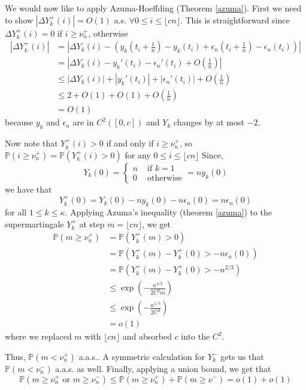 We would now like to apply Azuma-Hoeffding (Theorem \ref{azuma}). First we need to show \(|\Delta Y_{k}^{+}(i)| = O(1)\) a.s. \(\forall 0 \leq i \leq \lfloor {cn} \rfloor\). This is straightforward since \(\Delta Y_{k}^{+}(i) = 0\) if \(i \geq \nu_{n}^{+}\), otherwise 
\begin{align*}
    |\Delta Y_{k}^{+}(i)| &= |\Delta Y_{k}(i) - (y_{k}(t_{i} + \frac{1}{n}) - y_{k}(t_{i}) + \epsilon_{n}(t_{i} + \frac{1}{n}) - \epsilon_{n}(t_{i}))| \\
    &= |\Delta Y_{k}(i) - y_{k}'(t_{i}) - \epsilon_{n}'(t_{i}) + O(\frac{1}{n})| \\
    &\leq |\Delta Y_{k}(i)| + |y_{k}'(t_{i})| + |\epsilon_{n}'(t_{i})| + O(\frac{1}{n}) \\
    &\leq 2 + O(1) + O(1) + O(\frac{1}{n}) \\
    &= O(1)
\end{align*}
because \(y_{k}\) and \(\epsilon_{n}\) are in \(C^{2}([0, c])\) and \(Y_{k}\) changes by at most \(-2\).

Now note that \(Y_{k}^{+}(i) > 0\) if and only if \(i \geq \nu_{n}^{+}\), so \(\mathbb{P}(i \geq \nu_{n}^{+}) = \mathbb{P}(Y_{k}^{+}(i) > 0)\) for any \(0 \leq i \leq \lfloor {cn} \rfloor\) Since,
\[
    Y_{k}(0) = \begin{cases} n & \text{ if } k =1 \\ 0 & \text{ otherwise} \end{cases} = ny_{k}(0)
\]
we have that
\[
    Y_{k}^{+}(0) = Y_{k}(0) - ny_{k}(0) - n\epsilon_{n}(0) = n\epsilon_{n}(0)
\]
for all \(1 \leq k \leq \kappa\). Applying Azuma's inequality (theorem \ref{azuma}) to the supermartingale \(Y_{k}^{+}\) at step \(m = \lfloor {cn} \rfloor\), we get
\begin{align*}
    \mathbb{P}(m \geq \nu_{n}^{+}) &= \mathbb{P}(Y_{k}^{+}(m) > 0) \\
    &= \mathbb{P}(Y_{k}^{+}(m) - Y_{k}^{+}(0) > -n\epsilon_{n}(0)) \\
    &= \mathbb{P}(Y_{k}^{+}(m) - Y_{k}^{+}(0) > -n^{2/3}) \\
    &\leq  \exp\left( - \frac{n^{4/3} }{2 C^{2}m} \right) \\
    &\leq \exp\left( - \frac{n^{1/3} }{2 C^{2}} \right) \\
    &= o(1)
\end{align*}
where we replaced \(m\) with \(\lfloor {cn} \rfloor\) and absorbed \(c\) into the \(C^{2}\).

Thus, \(\mathbb{P}(m < \nu_{n}^{+})\) a.a.s.. A symmetric calculation for \(Y_{k}^{-}\) gets us that \(\mathbb{P}(m < \nu_{n}^{-})\) a.a.s. as well. Finally, applying a union bound, we get that
\[\mathbb{P}(m \geq \nu_{n}^{+} \text{ or } m \geq \nu_{n}^{-}) \leq \mathbb{P}(m \geq \nu_{n}^{+}) + \mathbb{P}(m \geq \nu^{-}) = o(1) + o(1)\]


